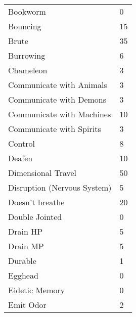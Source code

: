 \documentclass[twoside]{book}
\begin{document}
\begin{longtable}{p{1.25in}l}
  \raggedright
           Bookworm 
  &
   0 
  \tabularnewline
      
  \raggedright
           Bouncing 
  &
   15 
  \tabularnewline
      
  \raggedright
           Brute 
  &
   35 
  \tabularnewline
      
  \raggedright
           Burrowing 
  &
   6 
  \tabularnewline
      
  \raggedright
           Chameleon 
  &
   3 
  \tabularnewline
      
  \raggedright
           Communicate with Animals
           
  &
   3 
  \tabularnewline
      
  \raggedright
           Communicate with Demons
           
  &
   3 
  \tabularnewline
      
  \raggedright
           Communicate with Machines
           
  &
   10 
  \tabularnewline
      
  \raggedright
           Communicate with Spirits
           
  &
   3 
  \tabularnewline
      
  \raggedright
           Control 
  &
   8 
  \tabularnewline
      
  \raggedright
           Deafen 
  &
   10 
  \tabularnewline
      
  \raggedright
           Dimensional Travel 
  &
   50 
  \tabularnewline
      
  \raggedright
           Disruption (Nervous System)
           
  &
   5 
  \tabularnewline
      
  \raggedright
           Doesn't breathe 
  &
   20 
  \tabularnewline
      
  \raggedright
           Double Jointed 
  &
   0 
  \tabularnewline
      
  \raggedright
           Drain HP 
  &
   5 
  \tabularnewline
      
  \raggedright
           Drain MP 
  &
   5 
  \tabularnewline
      
  \raggedright
           Durable 
  &
   1 
  \tabularnewline
      
  \raggedright
           Egghead 
  &
   0 
  \tabularnewline
      
  \raggedright
           Eidetic Memory 
  &
   0 
  \tabularnewline
      
  \raggedright
           Emit Odor 
  &
   2 
  \tabularnewline
      

\end{longtable}
\end{document}
